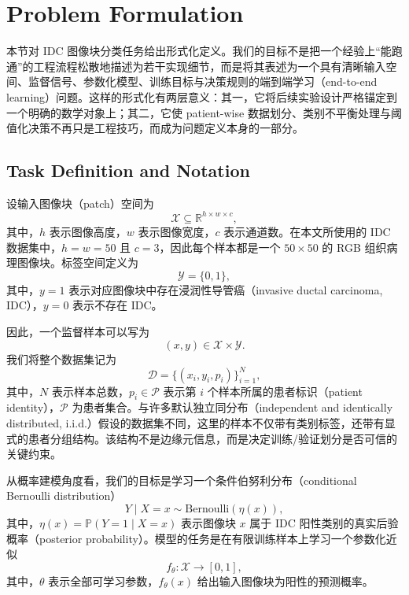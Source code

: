 ﻿\section{Problem Formulation}
\label{sec:problem_formulation}

本节对 IDC 图像块分类任务给出形式化定义。我们的目标不是把一个经验上“能跑通”的工程流程松散地描述为若干实现细节，而是将其表述为一个具有清晰输入空间、监督信号、参数化模型、训练目标与决策规则的端到端学习（end-to-end learning）问题。这样的形式化有两层意义：其一，它将后续实验设计严格锚定到一个明确的数学对象上；其二，它使 patient-wise 数据划分、类别不平衡处理与阈值化决策不再只是工程技巧，而成为问题定义本身的一部分。

\subsection{Task Definition and Notation}

设输入图像块（patch）空间为
\begin{equation}
    \mathcal{X} \subseteq \mathbb{R}^{h \times w \times c},
\end{equation}
其中，$h$ 表示图像高度，$w$ 表示图像宽度，$c$ 表示通道数。在本文所使用的 IDC 数据集中，$h = w = 50$ 且 $c = 3$，因此每个样本都是一个 $50 \times 50$ 的 RGB 组织病理图像块。标签空间定义为
\begin{equation}
    \mathcal{Y} = \{0,1\},
\end{equation}
其中，$y=1$ 表示对应图像块中存在浸润性导管癌（invasive ductal carcinoma, IDC），$y=0$ 表示不存在 IDC。

因此，一个监督样本可以写为
\begin{equation}
    (x,y) \in \mathcal{X} \times \mathcal{Y}.
\end{equation}
我们将整个数据集记为
\begin{equation}
    \mathcal{D} = \{(x_i, y_i, p_i)\}_{i=1}^{N},
\end{equation}
其中，$N$ 表示样本总数，$p_i \in \mathcal{P}$ 表示第 $i$ 个样本所属的患者标识（patient identity），$\mathcal{P}$ 为患者集合。与许多默认独立同分布（independent and identically distributed, i.i.d.）假设的数据集不同，这里的样本不仅带有类别标签，还带有显式的患者分组结构。该结构不是边缘元信息，而是决定训练/验证划分是否可信的关键约束。

从概率建模角度看，我们的目标是学习一个条件伯努利分布（conditional Bernoulli distribution）
\begin{equation}
    Y \mid X=x \sim \mathrm{Bernoulli}(\eta(x)),
\end{equation}
其中，$\eta(x) = \mathbb{P}(Y=1 \mid X=x)$ 表示图像块 $x$ 属于 IDC 阳性类别的真实后验概率（posterior probability）。模型的任务是在有限训练样本上学习一个参数化近似
\begin{equation}
    f_{\theta}: \mathcal{X} \rightarrow [0,1],
\end{equation}
其中，$\theta$ 表示全部可学习参数，$f_{\theta}(x)$ 给出输入图像块为阳性的预测概率。

